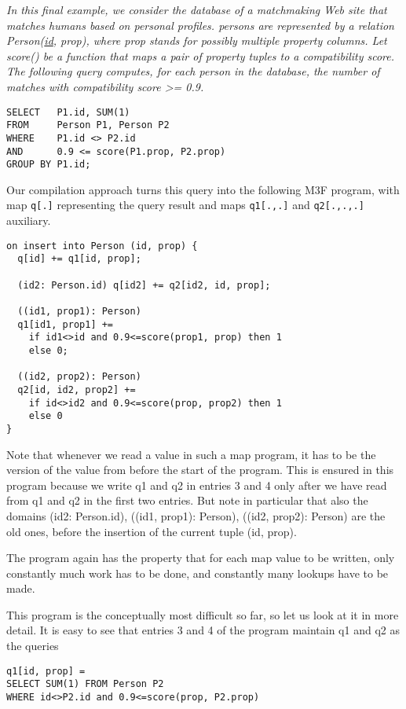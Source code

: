 \begin{example}\em
In this final example, we consider the data\-base of a matchmaking Web site
that matches humans based on personal profiles. persons are
represented by a relation Person(\underline{id}, prop), where
prop stands for possibly multiple property columns. Let score() be a
function that maps a pair of property tuples to a compatibility score.
The following query computes, for each person in the database, the number of
matches with compatibility score >= 0.9.
\begin{verbatim}
SELECT   P1.id, SUM(1)
FROM     Person P1, Person P2
WHERE    P1.id <> P2.id
AND      0.9 <= score(P1.prop, P2.prop)
GROUP BY P1.id;
\end{verbatim}

Our compilation approach turns this query into the following M3F program,
with map {\tt q[.]} representing the query result and maps {\tt q1[.,.]}
and {\tt q2[.,.,.]} auxiliary.
\begin{verbatim}
on insert into Person (id, prop) {
  q[id] += q1[id, prop];

  (id2: Person.id) q[id2] += q2[id2, id, prop];

  ((id1, prop1): Person)
  q1[id1, prop1] +=
    if id1<>id and 0.9<=score(prop1, prop) then 1
    else 0;

  ((id2, prop2): Person)
  q2[id, id2, prop2] +=
    if id<>id2 and 0.9<=score(prop, prop2) then 1
    else 0
}
\end{verbatim}
Note that whenever we read a value in such a map program, it has to be
the version of the value from before the start of the program. This is 
ensured in this program because we write q1 and q2 in entries 3 and 4 only
after we have read from q1 and q2 in the first two entries.
But note in particular that also the domains
(id2: Person.id), ((id1, prop1): Person), ((id2, prop2): Person)
are the old ones, before the insertion of the current tuple (id, prop).

The program again has the property that for
each map value to be written, only constantly much work has to be done,
and constantly many lookups have to be made.

This program is the conceptually most difficult so far, so let us look at it
in more detail. It is easy to see that entries 3 and 4 of the program
maintain q1 and q2 as the queries
\begin{verbatim}
q1[id, prop] =
SELECT SUM(1) FROM Person P2
WHERE id<>P2.id and 0.9<=score(prop, P2.prop) 


\end{verbatim}
\end{example}
